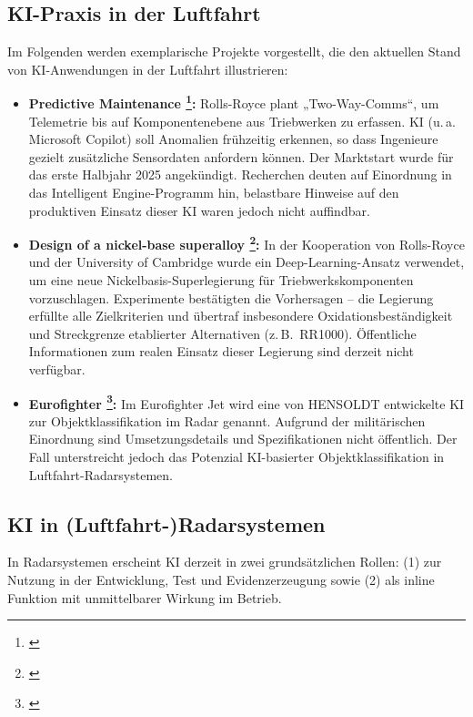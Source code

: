 \subsection{KI-Praxis in der Luftfahrt}
Im Folgenden werden exemplarische Projekte vorgestellt, die den aktuellen Stand von KI-Anwendungen in der Luftfahrt illustrieren:

\medskip
\begin{itemize}
  \item \textbf{Predictive Maintenance \footnote{ \parencite{handelsblatt-hannovermesse-2025}}:}
    Rolls-Royce plant „Two-Way-Comms“, um Telemetrie bis auf Komponentenebene aus Triebwerken zu erfassen.
    KI (u.\,a. Microsoft Copilot) soll Anomalien frühzeitig erkennen, so dass Ingenieure gezielt zusätzliche Sensordaten anfordern können.
    Der Marktstart wurde für das erste Halbjahr 2025 angekündigt. Recherchen deuten auf Einordnung in das Intelligent Engine-Programm hin,
    belastbare Hinweise auf den produktiven Einsatz dieser KI waren jedoch nicht auffindbar.
  \item \textbf{Design of a nickel-base superalloy \footnote{ \parencite{conduit2017-superalloy-nn}}:}
    In der Kooperation von Rolls-Royce und der University of Cambridge wurde ein Deep-Learning-Ansatz verwendet, um eine neue
    Nickelbasis-Superlegierung für Triebwerkskomponenten vorzuschlagen. Experimente bestätigten die Vorhersagen -- die Legierung erfüllte
    alle Zielkriterien und übertraf insbesondere Oxidationsbeständigkeit und Streckgrenze etablierter Alternativen (z.\,B.\ RR1000).
    Öffentliche Informationen zum realen Einsatz dieser Legierung sind derzeit nicht verfügbar.
  \item \textbf{Eurofighter \footnote{ \parencite{ecrs-mk1-release}}:}
    Im Eurofighter Jet wird eine von HENSOLDT entwickelte KI zur Objektklassifikation im Radar genannt.
    Aufgrund der militärischen Einordnung sind Umsetzungsdetails und Spezifikationen nicht öffentlich.
    Der Fall unterstreicht jedoch das Potenzial KI-basierter Objektklassifikation in Luftfahrt-Radarsystemen.
\end{itemize}



\subsection{KI in (Luftfahrt-)Radarsystemen}\label{sec:ki-radar-stand}
In Radarsystemen erscheint KI derzeit in zwei grundsätzlichen Rollen: 
(1) zur Nutzung in der Entwicklung, Test und Evidenzerzeugung sowie 
(2) als inline Funktion mit unmittelbarer Wirkung im Betrieb. 

